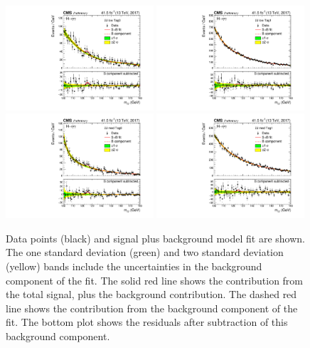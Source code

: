 \begin{figure}[hptb]
  \centering
  \includegraphics[width=0.49\textwidth]{Figures/Appendices/_forAppendix2017ch2_RECO_GE2J_PTH_0_60_Tag0_13TeV.pdf}
  \includegraphics[width=0.49\textwidth]{Figures/Appendices/_forAppendix2017ch2_RECO_GE2J_PTH_0_60_Tag1_13TeV.pdf}
  \includegraphics[width=0.49\textwidth]{Figures/Appendices/_forAppendix2017ch2_RECO_GE2J_PTH_60_120_Tag0_13TeV.pdf}
  \includegraphics[width=0.49\textwidth]{Figures/Appendices/_forAppendix2017ch2_RECO_GE2J_PTH_60_120_Tag1_13TeV.pdf}
  \caption[Signal plus background fits to data.]
  {
    Data points (black) and signal plus background model fit are shown. 
    The one standard deviation (green) and two standard deviation (yellow) bands 
    include the uncertainties in the background component of the fit. 
    The solid red line shows the contribution from the total signal, plus the background contribution. 
    The dashed red line shows the contribution from the background component of the fit. 
    The bottom plot shows the residuals after subtraction of this background component.
  }
\end{figure}


